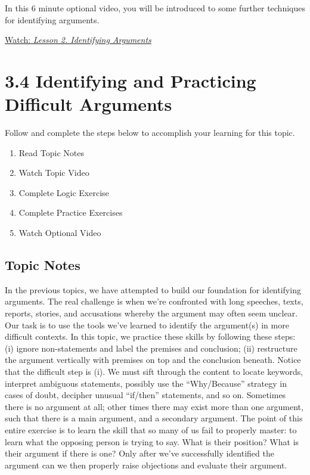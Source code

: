 \documentclass[
]{book}
\providecommand{\tightlist}{%
  \setlength{\itemsep}{0pt}\setlength{\parskip}{0pt}}
\begin{document}
\begin{reflect}
In this 6 minute optional video, you will be introduced to some further techniques for identifying arguments.

\href{https://www.youtube.com/watch?v=lYiEj5z8le8}{Watch: \emph{Lesson 2. Identifying Arguments}}
\end{reflect}

\hypertarget{identifying-and-practicing-difficult-arguments}{%
\section*{3.4 Identifying and Practicing Difficult Arguments}\label{identifying-and-practicing-difficult-arguments}}

Follow and complete the steps below to accomplish your learning for this topic.

\begin{enumerate}
\def\labelenumi{\arabic{enumi}.}
\tightlist
\item
  Read Topic Notes
\item
  Watch Topic Video
\item
  Complete Logic Exercise
\item
  Complete Practice Exercises
\item
  Watch Optional Video
\end{enumerate}

\hypertarget{topic-notes-11}{%
\subsection*{Topic Notes}\label{topic-notes-11}}

In the previous topics, we have attempted to build our foundation for identifying arguments. The real challenge is when we're confronted with long speeches, texts, reports, stories, and accusations whereby the argument may often seem unclear. Our task is to use the tools we've learned to identify the argument(s) in more difficult contexts. In this topic, we practice these skills by following these steps: (i) ignore non-statements and label the premises and conclusion; (ii) restructure the argument vertically with premises on top and the conclusion beneath. Notice that the difficult step is (i). We must sift through the content to locate keywords, interpret ambiguous statements, possibly use the ``Why/Because'' strategy in cases of doubt, decipher unusual ``if/then'' statements, and so on. Sometimes there is no argument at all; other times there may exist more than one argument, such that there is a main argument, and a secondary argument. The point of this entire exercise is to learn the skill that so many of us fail to properly master: to learn what the opposing person is trying to say. What is their position? What is their argument if there is one? Only after we've successfully identified the argument can we then properly raise objections and evaluate their argument.
\end{document}
